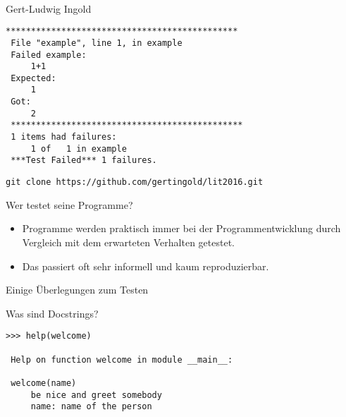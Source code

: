 \documentclass[t, utf8x, 10pt]{beamer}
\newcommand\pro{\textcolor{pro}{\faicon{smile-o}}}
\newcommand\contra{\textcolor{contra}{\faicon{frown-o}}}
\begin{document}
\begin{frame}[fragile]
 \vspace{1truecm}
 \begin{center}
  \\[0.3truecm]
  {\large Gert-Ludwig Ingold}

  \vspace{0.5truecm}
  \begin{minipage}{0.5\textwidth}
   \begin{tiny}
    \begin{lstlisting}[backgroundcolor=\color{black!10}
                       ,language={}]
 **********************************************
 File "example", line 1, in example
 Failed example:
     1+1
 Expected:
     1
 Got:
     2
 **********************************************
 1 items had failures:
     1 of   1 in example
 ***Test Failed*** 1 failures.
    \end{lstlisting}
   \end{tiny}
  \end{minipage}

  \vspace{1truecm}
  \texttt{\normalsize git clone https://github.com/gertingold/lit2016.git}
 \end{center}
\end{frame}


\begin{frame}[c]{Wer testet seine Programme?}
 \begin{itemize}
  \item[\pro]    Programme werden praktisch immer bei der Programmentwicklung
	         durch Vergleich mit dem erwarteten Verhalten getestet.
  \item[\contra] Das passiert oft sehr informell und kaum reproduzierbar.
 \end{itemize}
\end{frame}


\begin{frame}{Einige Überlegungen zum Testen}
\end{frame}


\begin{frame}[fragile]{Was sind Docstrings?}
 

 \hrulefill

 \begin{lstlisting}[language={}]
 >>> help(welcome)

 Help on function welcome in module __main__:

 welcome(name)
     be nice and greet somebody
     name: name of the person
 \end{lstlisting}
\end{frame}
\end{document}
